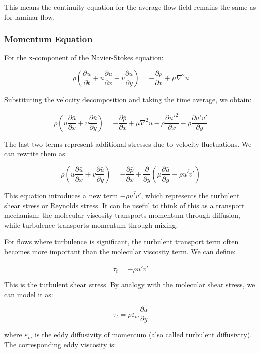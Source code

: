 This means the continuity equation for the average flow field remains the same as for laminar flow.

\subsubsection*{Momentum Equation}

For the x-component of the Navier-Stokes equation:

\[
\rho \left(\frac{\partial u}{\partial t} + u\frac{\partial u}{\partial x} + v\frac{\partial u}{\partial y}\right) = -\frac{\partial p}{\partial x} + \mu \nabla^2 u
\]

Substituting the velocity decomposition and taking the time average, we obtain:

\[
\rho \left(\bar{u}\frac{\partial \bar{u}}{\partial x} + \bar{v}\frac{\partial \bar{u}}{\partial y}\right) = -\frac{\partial \bar{p}}{\partial x} + \mu \nabla^2 \bar{u} - \rho\frac{\partial \overline{u'^2}}{\partial x} - \rho\frac{\partial \overline{u'v'}}{\partial y}
\]

The last two terms represent additional stresses due to velocity fluctuations. We can rewrite them as:

\[
\rho \left(\bar{u}\frac{\partial \bar{u}}{\partial x} + \bar{v}\frac{\partial \bar{u}}{\partial y}\right) = -\frac{\partial \bar{p}}{\partial x} + \frac{\partial}{\partial y}\left(\mu\frac{\partial \bar{u}}{\partial y} - \rho\overline{u'v'}\right)
\]

This equation introduces a new term $-\rho\overline{u'v'}$, which represents the turbulent shear stress or Reynolds stress. It can be useful to think of this as a transport mechanism: the molecular viscosity transports momentum through diffusion, while turbulence transports momentum through mixing.

For flows where turbulence is significant, the turbulent transport term often becomes more important than the molecular viscosity term. We can define:

\[
\tau_t = -\rho\overline{u'v'}
\]

This is the turbulent shear stress. By analogy with the molecular shear stress, we can model it as:

\[
\tau_t = \rho \varepsilon_m \frac{\partial \bar{u}}{\partial y}
\]

where $\varepsilon_m$ is the eddy diffusivity of momentum (also called turbulent diffusivity). The corresponding eddy viscosity is:

